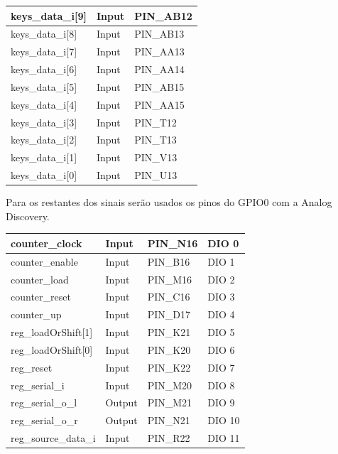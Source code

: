 \documentclass[12pt, a4paper]{article}
\begin{document}
	\begin{table}[H]
		\begin{center}
			\begin{tabular}{|l|l|l|}
				\hline
				keys\_data\_i{[}9{]} & Input & PIN\_AB12 \\ \hline
				keys\_data\_i{[}8{]} & Input & PIN\_AB13 \\ \hline
				keys\_data\_i{[}7{]} & Input & PIN\_AA13 \\ \hline
				keys\_data\_i{[}6{]} & Input & PIN\_AA14 \\ \hline
				keys\_data\_i{[}5{]} & Input & PIN\_AB15 \\ \hline
				keys\_data\_i{[}4{]} & Input & PIN\_AA15 \\ \hline
				keys\_data\_i{[}3{]} & Input & PIN\_T12  \\ \hline
				keys\_data\_i{[}2{]} & Input & PIN\_T13  \\ \hline
				keys\_data\_i{[}1{]} & Input & PIN\_V13  \\ \hline
				keys\_data\_i{[}0{]} & Input & PIN\_U13  \\ \hline
			\end{tabular}
		\end{center}
		
	\end{table}
	
	Para os restantes dos sinais serão usados os pinos do GPIO0 com a Analog Discovery.
	
	\begin{table}[H]
		\begin{center}
			\begin{tabular}{|l|l|l|l|}
				\hline
				counter\_clock          & Input  & PIN\_N16 & DIO 0  \\ \hline
				counter\_enable         & Input  & PIN\_B16 & DIO 1  \\ \hline
				counter\_load           & Input  & PIN\_M16 & DIO 2  \\ \hline
				counter\_reset          & Input  & PIN\_C16 & DIO 3  \\ \hline
				counter\_up             & Input  & PIN\_D17 & DIO 4  \\ \hline
				reg\_loadOrShift{[}1{]} & Input  & PIN\_K21 & DIO 5  \\ \hline
				reg\_loadOrShift{[}0{]} & Input  & PIN\_K20 & DIO 6  \\ \hline
				reg\_reset              & Input  & PIN\_K22 & DIO 7  \\ \hline
				reg\_serial\_i          & Input  & PIN\_M20 & DIO 8  \\ \hline
				reg\_serial\_o\_l       & Output & PIN\_M21 & DIO 9  \\ \hline
				reg\_serial\_o\_r       & Output & PIN\_N21 & DIO 10 \\ \hline
				reg\_source\_data\_i    & Input  & PIN\_R22 & DIO 11 \\ \hline
			\end{tabular}
		\end{center}
		
	\end{table}
	
\end{document}
